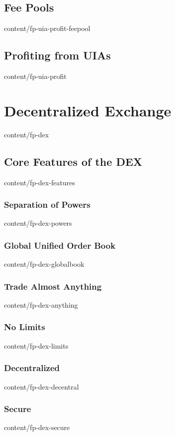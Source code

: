 \documentclass{btswhitepaper}
\begin{document}
\subsection     { Fee Pools                                        }  { content/fp-uia-profit-feepool  } 
\subsection     { Profiting from UIAs                              }  { content/fp-uia-profit          } 

\section        { Decentralized Exchange                           }  { content/fp-dex                 } 
\subsection     { Core Features of the DEX                         }  { content/fp-dex-features        } 
\subsubsection  { Separation of Powers                             }  { content/fp-dex-powers          } 
\subsubsection  { Global Unified Order Book                        }  { content/fp-dex-globalbook      } 
\subsubsection  { Trade Almost Anything                            }  { content/fp-dex-anything        } 
\subsubsection  { No Limits                                        }  { content/fp-dex-limits          } 
\subsubsection  { Decentralized                                    }  { content/fp-dex-decentral       } 
\subsubsection  { Secure                                           }  { content/fp-dex-secure          } 
\end{document}
